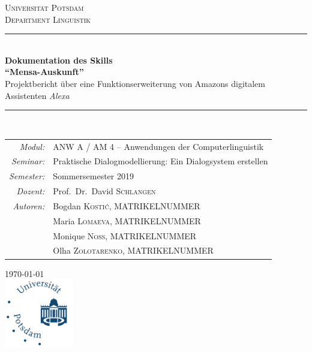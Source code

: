 \documentclass[12pt]{article}
\begin{document}
\begin{titlepage}
\begin{singlespacing}
\newcommand{\HRule}{\rule{\linewidth}{0.5mm}} %

\begin{center}
\textsc{\LARGE Universität Potsdam}\\[0.5cm]
\textsc{\large Department Linguistik}\\[1.5cm]
\HRule \\[0.4cm]
{\huge \bfseries Dokumentation des Skills\\[0.2cm] “Mensa-Auskunft”}\\[0.5cm]
{\Large Projektbericht über eine Funktionserweiterung von Amazons digitalem Assistenten \emph{Alexa}}\\[0.2cm]
\HRule \\[1cm]

\end{center}
\begin{tabular}{rl}
  \emph{Modul:}&
  ANW A / AM 4 – Anwendungen der Computerlinguistik\\[0.1cm]
  \emph{Seminar:}&
  Praktische Dialogmodellierung: Ein Dialogsystem erstellen\\[0.1cm]
  \emph{Semester:}&
  Sommersemester 2019\\[0.1cm]
  \emph{Dozent:}&
  Prof.~Dr.~David \textsc{Schlangen}\\[2cm]

  \emph{Autoren:}&
  Bogdan \textsc{Kostić},
  MATRIKELNUMMER\\&
  
  Maria \textsc{Lomaeva},
  MATRIKELNUMMER\\&
  
  Monique \textsc{Noss},
  MATRIKELNUMMER\\&
  
  Olha \textsc{Zolotarenko},
  MATRIKELNUMMER\\[1.75cm]
\end{tabular}

\begin{center}
{\large \today}\\[2cm]

\includegraphics[width=3cm]{uni_potsdam_logo.pdf}\\[1cm]
\end{center}

\end{singlespacing}
\end{titlepage}
\end{document}
